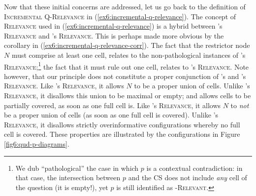 Now that these initial concerns are addressed, let us go back to the definition of \textsc{Incremental Q-Relevance} in (\ref{ex6:incremental-q-relevance}). The concept of \textsc{Relevance} used in (\ref{ex6:incremental-q-relevance}) is a hybrid between \citeauthor*{Lewis1988}'s \textsc{Relevance} and \citeauthor{Roberts2012}'s \textsc{Relevance}. This is perhaps made more obvious by the corollary in (\ref{ex6:incremental-q-relevance-corr}). The fact that the restrictor node $N$ must comprise at least one cell, relates to the non-pathological instances of \citeauthor*{Lewis1988}'s \textsc{Relevance};\footnote{We dub ``pathological'' the case in which $p$ is a contextual contradiction: in that case, the intersection between $p$ and the CS does not include \textit{any} cell of the question (it is empty!), yet $p$ is still identified as \textsc{\citeauthor*{Lewis1988}-Relevant}.} the fact that it must rule out one cell, relates to \citeauthor{Roberts2012}'s \textsc{Relevance}. Note however, that our principle does not constitute a proper conjunction of \citeauthor*{Lewis1988}'s and \citeauthor{Roberts2012}'s \textsc{Relevance}. Like \citeauthor*{Lewis1988}'s \textsc{Relevance}, it allows $N$ to be a proper union of cells. Unlike \citeauthor*{Lewis1988}'s \textsc{Relevance}, it disallows this union to be maximal or empty; and allows cells to be partially covered, as soon as one full cell is. Like \citeauthor{Roberts2012}'s \textsc{Relevance}, it allows $N$ to \textit{not} be a proper union of cells (as soon as one full cell is covered). Unlike \citeauthor{Roberts2012}'s \textsc{Relevance}, it disallows strictly overinformative configurations whereby no full cell is covered. These properties are illustrated by the configurations in Figure \ref{fig6:qud-p-diagrams}.


